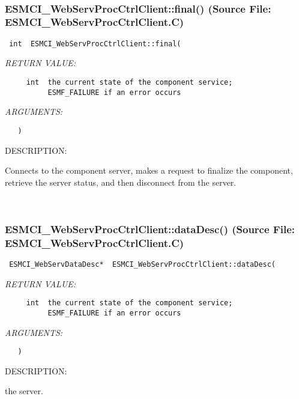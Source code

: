  
\mbox{}\hrulefill\
 
\subsubsection{ESMCI\_WebServProcCtrlClient::final() (Source File: ESMCI\_WebServProcCtrlClient.C)}


  
\begin{verbatim} int  ESMCI_WebServProcCtrlClient::final(\end{verbatim}{\em RETURN VALUE:}
\begin{verbatim}     int  the current state of the component service;
          ESMF_FAILURE if an error occurs\end{verbatim}{\em ARGUMENTS:}
\begin{verbatim}   )\end{verbatim}
{\sf DESCRIPTION:\\ }


      Connects to the component server, makes a request to finalize the
      component, retrieve the server status, and then disconnect from
      the server.
   
 
\mbox{}\hrulefill\
 
\subsubsection{ESMCI\_WebServProcCtrlClient::dataDesc() (Source File: ESMCI\_WebServProcCtrlClient.C)}


  
\begin{verbatim} ESMCI_WebServDataDesc*  ESMCI_WebServProcCtrlClient::dataDesc(\end{verbatim}{\em RETURN VALUE:}
\begin{verbatim}     int  the current state of the component service;
          ESMF_FAILURE if an error occurs\end{verbatim}{\em ARGUMENTS:}
\begin{verbatim}   )\end{verbatim}
{\sf DESCRIPTION:\\ }


      the server.
   
 
